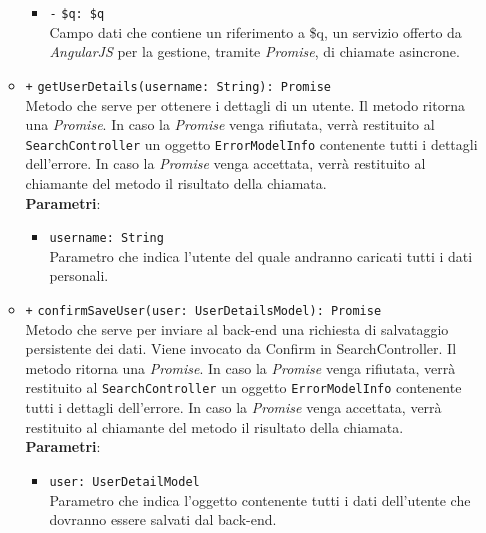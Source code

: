 \begin{itemize}
\begin{itemize}
\begin{itemize}
			\item \texttt{-} \texttt{\$q: \$q} \\ Campo dati che contiene un riferimento a \$q, un servizio offerto da \textit{AngularJS} per la gestione, tramite \textit{Promise}, di chiamate asincrone.
		\end{itemize}
		\item \texttt{+} \texttt{getUserDetails(username: String): Promise} \\ Metodo che serve per ottenere i dettagli di un utente. Il metodo ritorna una \textit{Promise}. In caso la \textit{Promise} venga rifiutata, verrà restituito al \texttt{SearchController} un oggetto \texttt{ErrorModelInfo} contenente tutti i dettagli dell'errore. In caso la \textit{Promise} venga accettata, verrà restituito al chiamante del metodo il risultato della chiamata.\\
		\textbf{Parametri}:
		\begin{itemize}
			\item \texttt{username: String} \\ Parametro che indica l'utente del quale andranno caricati tutti i dati personali.
		\end{itemize}
		\item \texttt{+} \texttt{confirmSaveUser(user: UserDetailsModel): Promise} \\Metodo che serve per inviare al back-end una richiesta di salvataggio persistente dei dati. Viene invocato da Confirm in SearchController. Il metodo ritorna una \textit{Promise}. In caso la \textit{Promise} venga rifiutata, verrà restituito al \texttt{SearchController} un oggetto \texttt{ErrorModelInfo} contenente tutti i dettagli dell'errore. In caso la \textit{Promise} venga accettata, verrà restituito al chiamante del metodo il risultato della chiamata.\\
		\textbf{Parametri}:
		\begin{itemize}
			\item \texttt{user: UserDetailModel} \\ Parametro che indica l'oggetto contenente tutti i dati dell'utente che dovranno essere salvati dal back-end.
		\end{itemize}
	
	\end{itemize}
\end{itemize}
